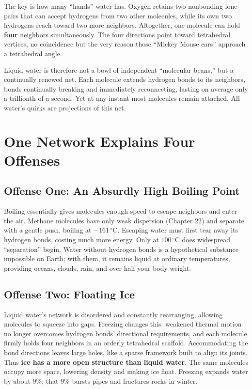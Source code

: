 The key is how many ``hands'' water has. Oxygen retains two nonbonding lone pairs that can accept hydrogens from two other molecules, while its own two hydrogens reach toward two more neighbors. Altogether, one molecule can hold \textbf{four} neighbors simultaneously. The four directions point toward tetrahedral vertices, no coincidence but the very reason those ``Mickey Mouse ears'' approach a tetrahedral angle.

Liquid water is therefore not a bowl of independent ``molecular beans,'' but a continually renewed net. Each molecule extends hydrogen bonds to its neighbors, bonds continually breaking and immediately reconnecting, lasting on average only a trillionth of a second. Yet at any instant most molecules remain attached. All water's quirks are projections of this net.

\section{One Network Explains Four Offenses}

\subsection{Offense One: An Absurdly High Boiling Point}

Boiling essentially gives molecules enough speed to escape neighbors and enter the air. Methane molecules have only weak dispersion (Chapter 22) and separate with a gentle push, boiling at $-161\,^{\circ}\mathrm{C}$. Escaping water must first tear away its hydrogen bonds, costing much more energy. Only at $100\,^{\circ}\mathrm{C}$ does widespread ``separation'' begin. Water without hydrogen bonds is a hypothetical substance impossible on Earth; with them, it remains liquid at ordinary temperatures, providing oceans, clouds, rain, and over half your body weight.

\subsection{Offense Two: Floating Ice}

Liquid water's network is disordered and constantly rearranging, allowing molecules to squeeze into gaps. Freezing changes this: weakened thermal motion no longer overcomes hydrogen bonds' directional requirements, and each molecule firmly holds four neighbors in an orderly tetrahedral scaffold. Accommodating the bond directions leaves large holes, like a sparse framework built to align its joints. Thus \textbf{ice has a more open structure than liquid water}. The same molecules occupy more space, lowering density and making ice float. Freezing expands water by about 9\%; that 9\% bursts pipes and fractures rocks in winter.

